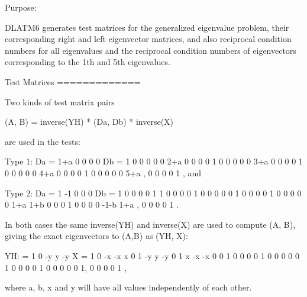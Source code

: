 \begin{DoxyParagraph}{Purpose\+: }
\begin{DoxyVerb} DLATM6 generates test matrices for the generalized eigenvalue
 problem, their corresponding right and left eigenvector matrices,
 and also reciprocal condition numbers for all eigenvalues and
 the reciprocal condition numbers of eigenvectors corresponding to
 the 1th and 5th eigenvalues.

 Test Matrices
 =============

 Two kinds of test matrix pairs

       (A, B) = inverse(YH) * (Da, Db) * inverse(X)

 are used in the tests:

 Type 1:
    Da = 1+a   0    0    0    0    Db = 1   0   0   0   0
          0   2+a   0    0    0         0   1   0   0   0
          0    0   3+a   0    0         0   0   1   0   0
          0    0    0   4+a   0         0   0   0   1   0
          0    0    0    0   5+a ,      0   0   0   0   1 , and

 Type 2:
    Da =  1   -1    0    0    0    Db = 1   0   0   0   0
          1    1    0    0    0         0   1   0   0   0
          0    0    1    0    0         0   0   1   0   0
          0    0    0   1+a  1+b        0   0   0   1   0
          0    0    0  -1-b  1+a ,      0   0   0   0   1 .

 In both cases the same inverse(YH) and inverse(X) are used to compute
 (A, B), giving the exact eigenvectors to (A,B) as (YH, X):

 YH:  =  1    0   -y    y   -y    X =  1   0  -x  -x   x
         0    1   -y    y   -y         0   1   x  -x  -x
         0    0    1    0    0         0   0   1   0   0
         0    0    0    1    0         0   0   0   1   0
         0    0    0    0    1,        0   0   0   0   1 ,

 where a, b, x and y will have all values independently of each other.\end{DoxyVerb}
 
\end{DoxyParagraph}

